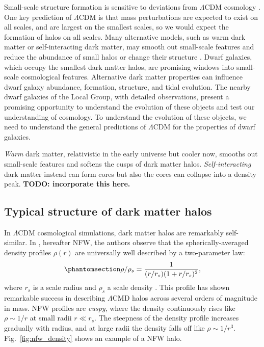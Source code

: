 Small-scale structure formation is sensitive to deviations from
\(\Lambda\)CDM cosmology \citep[e.g.,][]{bechtol+2022}. One key
prediction of \(\Lambda\)CDM is that mass perturbations are expected to
exist on all scales, and are largest on the smallest scales, so we would
expect the formation of halos on all scales. Many alternative models,
such as warm dark matter or self-interacting dark matter, may smooth out
small-scale features and reduce the abundance of small halos or change
their structure \citep[e.g.,][]{lovell+2014}. Dwarf galaxies, which
occupy the smallest dark matter halos, are promising windows into
small-scale cosmological features. Alternative dark matter properties
can influence dwarf galaxy abundance, formation, structure, and tidal
evolution. The nearby dwarf galaxies of the Local Group, with detailed
observations, present a promising opportunity to understand the
evolution of these objects and test our understanding of cosmology. To
understand the evolution of these objects, we need to understand the
general predictions of \(\Lambda\)CDM for the properties of dwarf
galaxies.

\emph{Warm} dark matter, relativistic in the early universe but cooler
now, smooths out small-scale features and softens the cusps of dark
matter halos. \emph{Self-interacting} dark matter instead can form cores
but also the cores can collapse into a density peak. \textbf{TODO:
incorporate this here.}

\subsection{Typical structure of dark matter
halos}\label{typical-structure-of-dark-matter-halos}

In \(\Lambda\)CDM cosmological simulations, dark matter halos are
remarkably self-similar. In \citet{NFW1996, NFW1997}, hereafter NFW, the
authors observe that the spherically-averaged density profiles
\(\rho(r)\) are universally well described by a two-parameter law:
\begin{equation}\protect\phantomsection\label{eq:nfw}{
\rho/\rho_s= \frac{1}{(r/r_s)(1+r/r_s)^2},
}\end{equation} where \(r_s\) is a scale radius and \(\rho_s\) a scale
density . This profile has shown remarkable success in describing
\(\Lambda\)CMD halos across several orders of magnitude in mass. NFW
profiles are \emph{cuspy}, where the density continuously rises like
\(\rho \sim 1/r\) at small radii \(r \ll r_s\). The steepness of the
density profile increases gradually with radius, and at large radii the
density falls off like \(\rho \sim 1/r^3\). Fig.~\ref{fig:nfw_density}
shows an example of a NFW halo.

